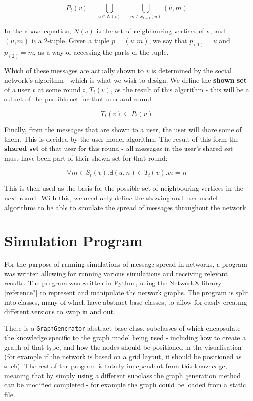 \documentclass[bsc,frontabs,twoside,singlespacing,parskip,deptreport]{infthesis}     %
\begin{document}
\begin{equation}
P_{t}(v) = \bigcup_{u \in N(v)} \quad \bigcup_{m \in S_{t-1}(u)} (u, m)
\end{equation}

In the above equation, $N(v)$ is the set of neighbouring vertices of v, and $(u, m)$ is a 2-tuple. Given a tuple $p = (u, m)$, we say that $p_{(1)} = u$ and $p_{(2)} = m$, as a way of accessing the parts of the tuple.

Which of these messages are actually shown to $v$ is determined by the social network's algorithm - which is what we wish to design. We define the \textbf{shown set} of a user $v$ at some round $t$, $T_{t}(v)$, as the result of this algorithm - this will be a subset of the possible set for that user and round:

\begin{equation}
T_{t}(v) \subseteq P_{t}(v)
\end{equation}

Finally, from the messages that are shown to a user, the user will share some of them. This is decided by the user model algorithm. The result of this form the \textbf{shared set} of that user for this round - all messages in the user's shared set must have been part of their shown set for that round:

\begin{equation}
\forall m \in S_{t}(v) . \exists (u, n) \in T_{t}(v) . m = n
\end{equation}

This is then used as the basis for the possible set of neighbouring vertices in the next round. With this, we need only define the showing and user model algorithms to be able to simulate the spread of messages throughout the network.

\section{Simulation Program}
For the purpose of running simulations of message spread in networks, a program was written allowing for running various simulations and receiving relevant results. The program was written in Python, using the NetworkX library [reference?] to represent and manipulate the network graphs. The program is split into classes, many of which have abstract base classes, to allow for easily creating different versions to swap in and out.

There is a \texttt{GraphGenerator} abstract base class, subclasses of which encapsulate the knowledge specific to the graph model being used - including how to create a graph of that type, and how the nodes should be positioned in the visualisation (for example if the network is based on a grid layout, it should be positioned as such). The rest of the program is totally independent from this knowledge, meaning that by simply using a different subclass the graph generation method can be modified completed - for example the graph could be loaded from a static file.
\end{document}
